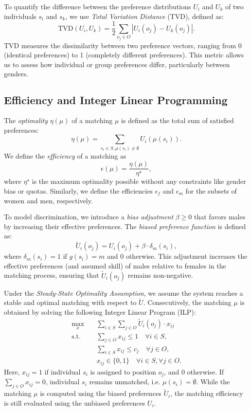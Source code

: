 \documentclass[letterpaper]{article}
\begin{document}
To quantify the difference between the preference distributions \( U_i \) and \( U_k \) of two individuals \( s_i \) and \( s_k \), we use \textit{Total Variation Distance} (TVD), defined as:
\[
\text{TVD}(U_i, U_k) = \frac{1}{2} \sum_{o_j \in O} \left| U_i(o_j) - U_k(o_j) \right|.
\]
TVD measures the dissimilarity between two preference vectors, ranging from 0 (identical preferences) to 1 (completely different preferences). This metric allows us to assess how individual or group preferences differ, particularly between genders.

\subsection*{Efficiency and Integer Linear Programming}

The \textit{optimality} \( \eta(\mu) \) of a matching \( \mu \) is defined as the total sum of satisfied preferences:
\[
\eta(\mu) = \sum_{s_i \in S, \mu(s_i) \neq \emptyset} U_i(\mu(s_i)).
\]
We define the \textit{efficiency} of a matching as
\[
\epsilon(\mu)=\frac{\eta(\mu)}{\eta^{\star}},
\]
where \(\eta^{\star}\) is the maximum optimality possible without any constraints like gender bias or quotas. Similarly, we define the efficiencies \( \epsilon_f \) and \( \epsilon_m\) for the subsets of women and men, respectively.

To model discrimination, we introduce a \textit{bias adjustment} \( \beta \geq 0 \) that favors males by increasing their effective preferences. The \textit{biased preference function} is defined as:
\[
\tilde{U}_i(o_j) = U_i(o_j) + \beta \cdot \delta_m(s_i),
\]
where \( \delta_m(s_i) = 1 \) if \( g(s_i) = m \) and \( 0 \) otherwise. This adjustment increases the effective preferences (and assumed skill) of males relative to females in the matching process, ensuring that \( \tilde{U}_i(o_j) \) remains non-negative.


Under the \textit{Steady-State Optimality Assumption}, we assume the system reaches a stable and optimal matching with respect to \( \tilde{U} \). Consecutively, the matching \( \mu \) is obtained by solving the following Integer Linear Program (ILP):
\begin{align*}
\max_{x} \quad & \sum_{i \in S} \sum_{j \in O} \tilde{U}_i(o_j) \cdot x_{ij} \\
\text{s.t.} \quad & \sum_{j \in O} x_{ij} \leq 1 \quad \forall i \in S, \\
& \sum_{i \in S} x_{ij} \leq c_j \quad \forall j \in O, \\
& x_{ij} \in \{0, 1\} \quad \forall i \in S, \forall j \in O.
\end{align*}
Here, \( x_{ij} = 1 \) if individual \( s_i \) is assigned to position \( o_j \), and \( 0 \) otherwise. If \( \sum_{j \in O} x_{ij} = 0 \), individual \( s_i \) remains unmatched, i.e. \(\mu(s_i) = \emptyset\). While the matching \( \mu \) is computed using the biased preferences \( \tilde{U}_i \), the matching efficiency is still evaluated using the unbiased preferences \( U_i \).
\end{document}
